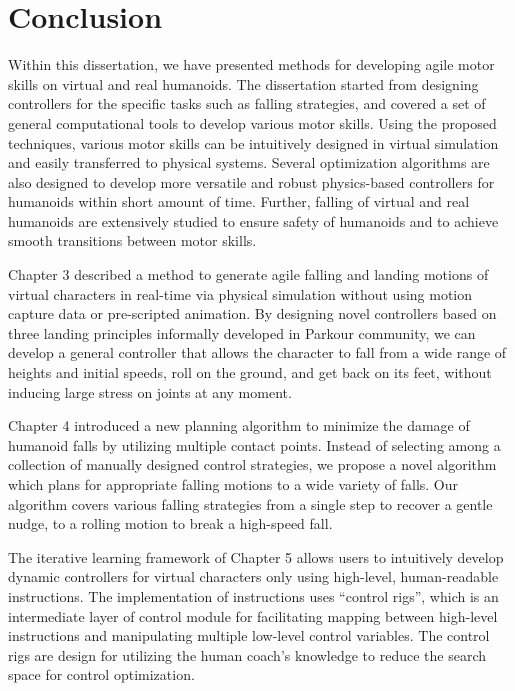 \chapter{Conclusion}

Within this dissertation, we have presented methods for developing agile motor
skills on virtual and real humanoids.
The dissertation started from designing controllers for the specific tasks
such as falling strategies,
and covered a set of general computational tools to develop
various motor skills.
Using the proposed techniques, various motor skills can be intuitively designed
in virtual simulation and easily transferred to physical systems.
Several optimization algorithms are also designed to develop more versatile and
robust physics-based controllers for humanoids within short amount of time.
Further, falling of virtual and real humanoids are extensively studied to
ensure safety of humanoids and to achieve smooth transitions between motor
skills.

Chapter 3 described a method to generate agile falling and landing motions of
virtual characters in real-time via physical simulation
without using motion capture data or pre-scripted animation.
By designing novel controllers based on three landing principles informally
developed in Parkour community, we can develop a general controller that
allows the character to fall from a wide range of heights and initial speeds,
roll on the ground, and get back on its feet, without inducing large stress on
joints at any moment.

Chapter 4 introduced a new planning algorithm to minimize the damage
of humanoid falls by utilizing multiple contact points.
Instead of selecting among a collection of manually designed control
strategies, we propose a novel algorithm which plans for appropriate
falling motions to a wide variety of falls.
Our algorithm covers various falling strategies from a single step to recover a
gentle nudge, to a rolling motion to break a high-speed fall.

The iterative learning framework of Chapter 5 allows users to intuitively
develop dynamic controllers for virtual characters only using high-level,
human-readable instructions.
The implementation of instructions uses ``control rigs'', which is an
intermediate layer of control module 
for facilitating mapping between high-level instructions and manipulating
multiple low-level control variables.
The control rigs are design for utilizing the human coach's knowledge to reduce 
the search space for control optimization.


